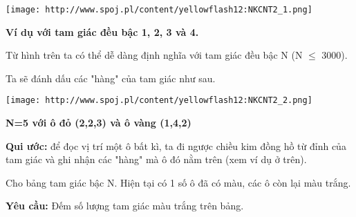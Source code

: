 \texttt{[image: http://www.spoj.pl/content/yellowflash12:NKCNT2\_1.png]}

\textbf{    Ví dụ với tam giác đều bậc 1, 2, 3 và 4.   }

   Từ hình trên ta có thể dễ dàng định nghĩa với tam giác đều bậc N (N  $\le$  3000).  

   Ta sẽ đánh dấu các "hàng" của tam giác như sau.  


\texttt{[image: http://www.spoj.pl/content/yellowflash12:NKCNT2\_2.png]}

\textbf{    N=5 với ô đỏ (2,2,3) và ô vàng (1,4,2)   }

\textbf{    Qui ước:   }   để đọc vị trí một ô bất kì, ta đi ngược chiều kim đồng hồ từ đỉnh của tam giác và ghi nhận các "hàng" mà ô đó nằm trên (xem ví dụ ở trên).  

   Cho bảng tam giác bậc N. Hiện tại có 1 số ô đã có màu, các ô còn lại màu trắng.  

\textbf{    Yêu cầu:   }   Đếm số lượng tam giác màu trắng trên bảng.  

\